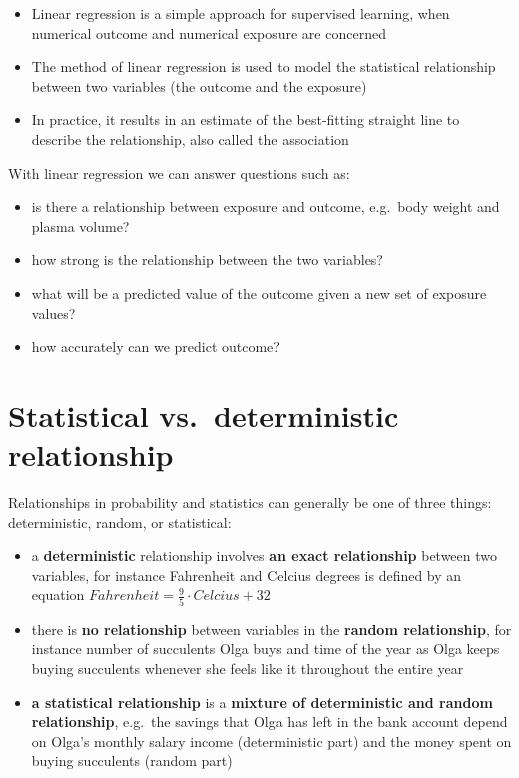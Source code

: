 \documentclass[
]{book}
\providecommand{\tightlist}{%
  \setlength{\itemsep}{0pt}\setlength{\parskip}{0pt}}
\theoremstyle{definition}
\theoremstyle{definition}
\theoremstyle{definition}
\theoremstyle{remark}
\begin{document}
\begin{itemize}
\tightlist
\item
  Linear regression is a simple approach for supervised learning, when numerical outcome and numerical exposure are concerned
\item
  The method of linear regression is used to model the statistical relationship between two variables (the outcome and the exposure)
\item
  In practice, it results in an estimate of the best-fitting straight line to describe the relationship, also called the association
\end{itemize}

With linear regression we can answer questions such as:

\begin{itemize}
\tightlist
\item
  is there a relationship between exposure and outcome, e.g.~body weight and plasma volume?
\item
  how strong is the relationship between the two variables?
\item
  what will be a predicted value of the outcome given a new set of exposure values?
\item
  how accurately can we predict outcome?
\end{itemize}

\hypertarget{statistical-vs.-deterministic-relationship}{%
\section{Statistical vs.~deterministic relationship}\label{statistical-vs.-deterministic-relationship}}

Relationships in probability and statistics can generally be one of three things: deterministic, random, or statistical:

\begin{itemize}
\tightlist
\item
  a \textbf{deterministic} relationship involves \textbf{an exact relationship} between two variables, for instance Fahrenheit and Celcius degrees is defined by an equation \(Fahrenheit=\frac{9}{5}\cdot Celcius+32\)
\item
  there is \textbf{no relationship} between variables in the \textbf{random relationship}, for instance number of succulents Olga buys and time of the year as Olga keeps buying succulents whenever she feels like it throughout the entire year
\item
  \textbf{a statistical relationship} is a \textbf{mixture of deterministic and random relationship}, e.g.~the savings that Olga has left in the bank account depend on Olga's monthly salary income (deterministic part) and the money spent on buying succulents (random part)
\end{itemize}
\end{document}

